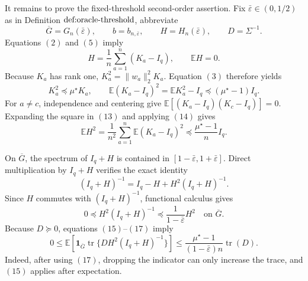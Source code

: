 It remains to prove the fixed-threshold second-order assertion.  Fix \(\bar\varepsilon\in(0,1/2)\) as in Definition \(\textnormal{def:oracle-threshold}\), abbreviate
\[
 \overline G=G_n(\bar\varepsilon),
 \qquad b=b_{n,\bar\varepsilon},
 \qquad H=H_n(\bar\varepsilon),
 \qquad D=\Sigma^{-1}.
\]
Equations \((2)\) and \((5)\) imply
\[
 H=\frac1n\sum_{a=1}^n(K_a-I_q),
 \qquad \mathbb EH=0.
 \tag{13}
\]
Because \(K_a\) has rank one, \(K_a^2=\|w_a\|_2^2K_a\).  Equation \((3)\) therefore yields
\[
 K_a^2\preceq\mu^\star K_a,
 \qquad
 \mathbb E(K_a-I_q)^2=\mathbb EK_a^2-I_q
 \preceq(\mu^\star-1)I_q.
 \tag{14}
\]
For \(a\ne c\), independence and centering give \(\mathbb E[(K_a-I_q)(K_c-I_q)]=0\).  Expanding the square in \((13)\) and applying \((14)\) gives
\[
 \mathbb EH^2
 =\frac1{n^2}\sum_{a=1}^n\mathbb E(K_a-I_q)^2
 \preceq\frac{\mu^\star-1}{n}I_q.
 \tag{15}
\]

On \(\overline G\), the spectrum of \(I_q+H\) is contained in \([1-\bar\varepsilon,1+\bar\varepsilon]\).  Direct multiplication by \(I_q+H\) verifies the exact identity
\[
 (I_q+H)^{-1}=I_q-H+H^2(I_q+H)^{-1}.
 \tag{16}
\]
Since \(H\) commutes with \((I_q+H)^{-1}\), functional calculus gives
\[
 0\preceq H^2(I_q+H)^{-1}
 \preceq\frac1{1-\bar\varepsilon}H^2
 \quad\text{on }\overline G.
 \tag{17}
\]
Because \(D\succeq0\), equations \((15)\)--\((17)\) imply
\[
 0\le
 \mathbb E\!\left[\mathbf 1_{\overline G}
 \operatorname{tr}\{DH^2(I_q+H)^{-1}\}\right]
 \le\frac{\mu^\star-1}{(1-\bar\varepsilon)n}\operatorname{tr}(D).
 \tag{18}
\]
Indeed, after using \((17)\), dropping the indicator can only increase the trace, and \((15)\) applies after expectation.

